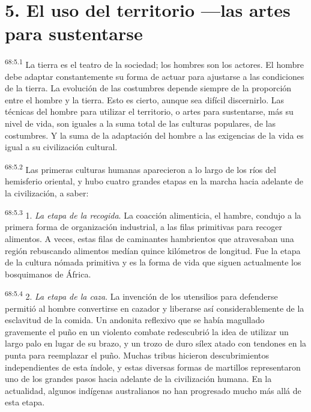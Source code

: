 \section*{5. El uso del territorio ---las artes para sustentarse}
\par
\textsuperscript{68:5.1} La tierra es el teatro de la sociedad; los hombres son los actores. El hombre debe adaptar constantemente su forma de actuar para ajustarse a las condiciones de la tierra. La evolución de las costumbres depende siempre de la proporción entre el hombre y la tierra. Esto es cierto, aunque sea difícil discernirlo. Las técnicas del hombre para utilizar el territorio, o artes para sustentarse, más su nivel de vida, son iguales a la suma total de las culturas populares, de las costumbres. Y la suma de la adaptación del hombre a las exigencias de la vida es igual a su civilización cultural.

\par
\textsuperscript{68:5.2} Las primeras culturas humanas aparecieron a lo largo de los ríos del hemisferio oriental, y hubo cuatro grandes etapas en la marcha hacia adelante de la civilización, a saber:

\par
\textsuperscript{68:5.3} 1. \textit{La etapa de la recogida}. La coacción alimenticia, el hambre, condujo a la primera forma de organización industrial, a las filas primitivas para recoger alimentos. A veces, estas filas de caminantes hambrientos que atravesaban una región rebuscando alimentos medían quince kilómetros de longitud. Fue la etapa de la cultura nómada primitiva y es la forma de vida que siguen actualmente los bosquimanos de África.

\par
\textsuperscript{68:5.4} 2. \textit{La etapa de la caza}. La invención de los utensilios para defenderse permitió al hombre convertirse en cazador y liberarse así considerablemente de la esclavitud de la comida. Un andonita reflexivo que se había magullado gravemente el puño en un violento combate redescubrió la idea de utilizar un largo palo en lugar de su brazo, y un trozo de duro sílex atado con tendones en la punta para reemplazar el puño. Muchas tribus hicieron descubrimientos independientes de esta índole, y estas diversas formas de martillos representaron uno de los grandes pasos hacia adelante de la civilización humana. En la actualidad, algunos indígenas australianos no han progresado mucho más allá de esta etapa.


